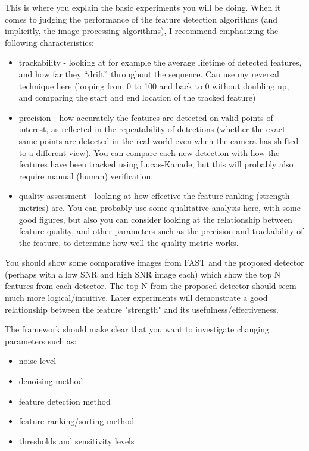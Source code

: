 This is where you explain the basic experiments you will be doing. When it comes to judging the performance of the feature detection algorithms (and implicitly, the image processing algorithms), I recommend emphasizing the following characteristics:

\begin{itemize}
	\item trackability - looking at for example the average lifetime of detected features, and how far they "`drift"' throughout the sequence. Can use my reversal technique here (looping from 0 to 100 and back to 0 without doubling up, and comparing the start and end location of the tracked feature)
	\item precision - how accurately the features are detected on valid points-of-interest, as reflected in the repeatability of detections (whether the exact same points are detected in the real world even when the camera has shifted to a different view). You can compare each new detection with how the features have been tracked using Lucas-Kanade, but this will probably also require manual (human) verification.
	\item quality assessment - looking at how effective the feature ranking (strength metrics) are. You can probably use some qualitative analysis here, with some good figures, but also you can consider looking at the relationship between feature quality, and other parameters such as the precision and trackability of the feature, to determine how well the quality metric works.
\end{itemize}

You should show some comparative images from FAST and the proposed detector (perhaps with a low SNR and high SNR image each) which show the top N features from each detector. The top N from the proposed detector should seem much more logical/intuitive. Later experiments will demonstrate a good relationship between the feature "strength" and its usefulness/effectiveness.

The framework should make clear that you want to investigate changing parameters such as:

\begin{itemize}
	\item noise level
	\item denoising method
	\item feature detection method
	\item feature ranking/sorting method
	\item thresholds and sensitivity levels
\end{itemize}